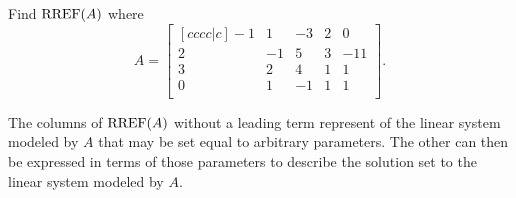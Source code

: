 \begin{applicationActivities}{3}{5}
\begin{activity}{15}
  Find \(\operatorname{RREF}(A)\) where
  \[A=
    \begin{bmatrix}[cccc|c]
      -1 &  1 & -3 &  2 &  0 \\
       2 & -1 &  5 &  3 & -11 \\
       3 &  2 &  4 &  1 &  1 \\
       0 &  1 & -1 &  1 &  1 \\
    \end{bmatrix}
  .\]
\end{activity}

\begin{definition}
  The columns of \(\operatorname{RREF}(A)\) without a leading term represent
   of the linear system modeled by \(A\)
  that may be set equal to arbitrary parameters.
  The other  can then be expressed in terms
  of those parameters to describe the solution set
  to the linear system modeled by \(A\).
\end{definition}


\end{applicationActivities}
